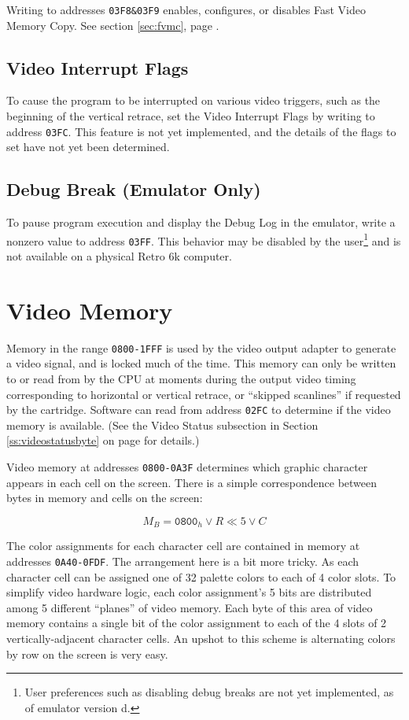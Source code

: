 \documentclass[12pt]{{memoir}}
\begin{document}
Writing to addresses \texttt{03F8\&03F9} enables, configures, or disables Fast Video Memory Copy. See section \ref{sec:fvmc}, page \pageref{sec:fvmc}.

\subsection{Video Interrupt Flags}

To cause the program to be interrupted on various video triggers, such as the beginning of the vertical retrace, set the Video Interrupt Flags by writing to address \texttt{03FC}. This feature is not yet implemented, and the details of the flags to set have not yet been determined.

\subsection{Debug Break (Emulator Only)}

To pause program execution and display the Debug Log in the emulator, write a nonzero value to address \texttt{03FF}. This behavior may be disabled by the user\footnote{User preferences such as disabling debug breaks are not yet implemented, as of emulator version d.} and is not available on a physical Retro 6k computer.

\section{Video Memory}
\label{sec:videomem}

Memory in the range \texttt{0800-1FFF} is used by the video output adapter to generate a video signal, and is locked much of the time. This memory can only be written to or read from by the CPU at moments during the output video timing corresponding to horizontal or vertical retrace, or ``skipped scanlines'' if requested by the cartridge. Software can read from address \texttt{02FC} to determine if the video memory is available. (See the Video Status subsection in Section \ref{ss:videostatusbyte} on page \pageref{ss:videostatusbyte} for details.)

Video memory at addresses \texttt{0800-0A3F} determines which graphic character appears in each cell on the screen. There is a simple correspondence between bytes in memory and cells on the screen:

$$M_B = \texttt{0800}_h \vee  R \ll 5 \vee C$$

The color assignments for each character cell are contained in memory at addresses \texttt{0A40-0FDF}. The arrangement here is a bit more tricky. As each character cell can be assigned one of 32 palette colors to each of 4 color slots. To simplify video hardware logic, each color assignment's 5 bits are distributed among 5 different ``planes'' of video memory. Each byte of this area of video memory contains a single bit of the color assignment to each of the 4 slots of 2 vertically-adjacent character cells. An upshot to this scheme is alternating colors by row on the screen is very easy.
\end{document}
